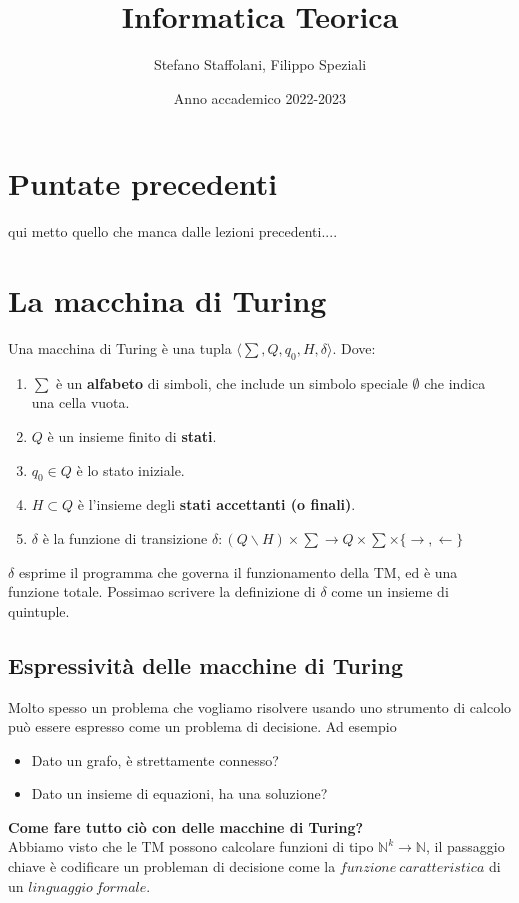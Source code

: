 \documentclass[a4paper, 12pt]{article}
\title{Informatica Teorica}
\author{Stefano Staffolani, Filippo Speziali}
\date{ Anno accademico 2022-2023}
\begin{document}
\maketitle
\tableofcontents
\newpage
\section{Puntate precedenti}
qui metto quello che manca dalle lezioni precedenti....
\section{La macchina di Turing}
Una macchina di Turing \`e una tupla $\langle \sum, Q,q_0,H,\delta\rangle$. Dove: 
\begin{enumerate}
\item $\sum$ \`e un \textbf{alfabeto} di simboli, che include un simbolo speciale $\emptyset$ che indica una cella vuota.
\item $Q$ \`e un insieme finito di \textbf{stati}.
\item $q_0 \in Q$ \`e lo stato iniziale.
\item $H \subset Q$ \`e l'insieme degli \textbf{stati accettanti (o finali)}.
\item $\delta$ \`e la funzione di transizione $\delta: (Q \backslash H) \times \sum \rightarrow Q \times \sum \times \{ \rightarrow, \leftarrow \} $
\end{enumerate}
$\delta$ esprime il programma che governa il funzionamento della TM, ed \`e una funzione totale. Possimao scrivere la definizione di $\delta$ come un insieme di quintuple.
\subsection{Espressivit\`a delle macchine di Turing}
Molto spesso un problema che vogliamo risolvere usando uno strumento di calcolo pu\`o essere espresso come un problema di decisione. Ad esempio\begin{itemize}
\item Dato un grafo, \`e strettamente connesso?
\item Dato un insieme di equazioni, ha una soluzione?
\end{itemize}
\textbf{Come fare tutto ci\`o con delle macchine di Turing?}\\
Abbiamo visto che le TM possono calcolare funzioni di tipo $\mathbb{N}^{k} \rightarrow \mathbb{N}$, il passaggio chiave \`e codificare un probleman di decisione come la $funzione\ caratteristica$ di un $linguaggio\ formale$.
\end{document}
